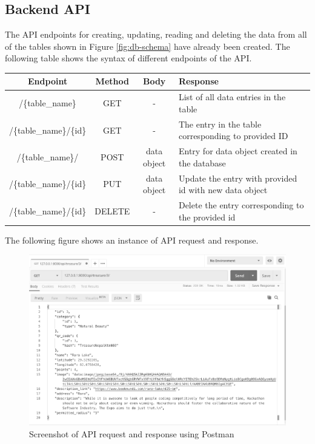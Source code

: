 \documentclass[12pt, a4paper, oneside]{article}
\begin{document}
\subsection{Backend API}
The API endpoints for creating, updating, reading and deleting the data from all of the tables shown in Figure \ref{fig:db-schema} have already been created. The following table shows the syntax of different endpoints of the API.


\begin{table}[H]
\begin{tabularx}{\linewidth}{|c|c|c|X|}
\hline
\rowcolor[HTML]{C0C0C0} 
\textbf{Endpoint}                & \textbf{Method} & \textbf{Body}        & \textbf{Response}                                               \\ \hline
/\{table\_name\}        & GET    & -           & List of all data entries in the table                  \\ \hline
/\{table\_name\}/\{id\} & GET    & -           & The entry in the table corresponding to provided ID    \\ \hline
/\{table\_name\}/       & POST   & data object & Entry for data object created in the database          \\ \hline
/\{table\_name\}/\{id\} & PUT    & data object & Update the entry with provided id with new data object \\ \hline
/\{table\_name\}/\{id\} & DELETE & -           & Delete the entry corresponding to the provided id      \\ \hline
\end{tabularx}
\end{table}

The following figure shows an instance of API request and response.

\begin{figure}[H]
\includegraphics[width=\linewidth, keepaspectratio]{screenshots/api.png}
\centering
\caption{Screenshot of API request and response using Postman}
\label{fig:auth-sequence}
\end{figure}
\end{document}
